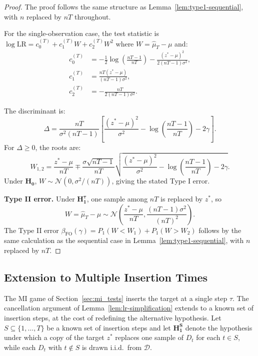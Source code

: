 \documentclass{article}
\theoremstyle{plain}
\theoremstyle{definition}
\theoremstyle{remark}
\newcommand{\cD}{\ensuremath{\mathcal{D}}}
\renewcommand{\geq}{\geqslant}
\begin{document}
\begin{proof}
    The proof follows the same structure as Lemma~\ref{lem:type1-sequential}, with $n$ replaced by $nT$ throughout.

    For the single-observation case, the test statistic is $\log \mathrm{LR} = c_0^{(T)} + c_1^{(T)} W + c_2^{(T)} W^2$ where $W = \hat{\mu}_T - \mu$ and:
    \begin{align*}
        c_0^{(T)} & = -\frac{1}{2}\log\left(\frac{nT-1}{nT}\right) - \frac{(z^* - \mu)^2}{2(nT-1)\sigma^2}, \\
        c_1^{(T)} & = \frac{nT(z^* - \mu)}{(nT-1)\sigma^2},                                                 \\
        c_2^{(T)} & = -\frac{nT}{2(nT-1)\sigma^2}.
    \end{align*}

    The discriminant is:
    \begin{equation*}
        \Delta = \frac{nT}{\sigma^2(nT-1)}\left[\frac{(z^* - \mu)^2}{\sigma^2} - \log\left(\frac{nT-1}{nT}\right) - 2\gamma\right].
    \end{equation*}
    For $\Delta \geq 0$, the roots are:
    \begin{equation*}
        W_{1,2} = \frac{z^* - \mu}{nT} \mp \frac{\sigma\sqrt{nT-1}}{nT}\sqrt{\frac{(z^* - \mu)^2}{\sigma^2} - \log\left(\frac{nT-1}{nT}\right) - 2\gamma}.
    \end{equation*}
    Under $\mathbf{H_0}$, $W \sim \mathcal{N}(0, \sigma^2/(nT))$, giving the stated Type I error.

    \textbf{Type II error.} Under $\mathbf{H_1^\tau}$, one sample among $nT$ is replaced by $z^*$, so
    \begin{equation*}
        W = \hat{\mu}_T - \mu \sim \mathcal{N}\left(\frac{z^* - \mu}{nT}, \frac{(nT-1)\sigma^2}{(nT)^2}\right).
    \end{equation*}
    The Type II error $\beta_{\mathrm{FO}}(\gamma) = P_1(W < W_1) + P_1(W > W_2)$ follows by the same calculation as the sequential case in Lemma~\ref{lem:type1-sequential}, with $n$ replaced by $nT$.
\end{proof}

\subsection{Extension to Multiple Insertion Times}
\label{app:multi-insertion}

The MI game of Section~\ref{sec:mi_tests} inserts the target at a single step $\tau$. The cancellation argument of Lemma~\ref{lem:lr-simplification} extends to a known set of insertion steps, at the cost of redefining the alternative hypothesis. Let $S \subseteq \{1, \ldots, T\}$ be a known set of insertion steps and let $\mathbf{H_1^S}$ denote the hypothesis under which a copy of the target $z^*$ replaces one sample of $D_t$ for each $t \in S$, while each $D_t$ with $t \notin S$ is drawn i.i.d.\ from $\cD$.
\end{document}
